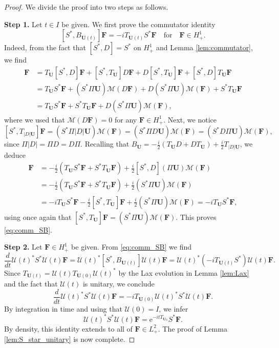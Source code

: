 \documentclass[10pt,reqno,a4paper]{amsart}
\theoremstyle{definition}
\theoremstyle{remark}
\theoremstyle{remark}
\numberwithin{equation}{section}
\newcommand{\Mean}{\mathscr{M}}
\newcommand{\be}{\begin{equation}}
\newcommand{\ee}{\end{equation}}
\newcommand{\ii}{i}
\newcommand{\eu}{\mathrm{e}}
\newcommand{\Ub}{\mathbf{U}}
\newcommand{\Fb}{\mathbf{F}}
\newcommand{\id}{I}
\newcommand{\Us}{\mathscr{U}}
\begin{document}
\begin{proof}
We divide the proof into two steps as follows.

\medskip
\textbf{Step 1.}  Let $t \in I$ be given. We first prove the commutator identity
\be \label{eq:comm_SB}
 [S^*, B_{\Ub(t)}] \Fb = -\ii T_{\Ub(t)} S^* \Fb  \quad \mbox{for} \quad \Fb \in H^1_+.
\ee
Indeed, from the fact that $[S^*, D]  = S^*$ on $H^1_+$ and Lemma \ref{lem:commutator}, we find
\begin{align*}
[S^*, T_\Ub D + D T_\Ub] \Fb & = T_\Ub [S^*,D] \Fb + [S^*,T_\Ub] D \Fb + D [S^*, T_\Ub] \Fb + [S^*,D] T_\Ub \Fb \\
& = T_{\Ub} S^* \Fb + (S^* \Pi \Ub) \Mean(D \Fb) + D ( S^* \Pi \Ub) \Mean(\Fb) + S^* T_\Ub \Fb\\
& = T_\Ub S^* \Fb + S^* T_\Ub \Fb + D (S^* \Pi \Ub) \Mean(\Fb),
\end{align*}
where we used that $\Mean(D \Fb)=0$ for any $\Fb \in H^1_+$. Next, we notice
$$
[S^*, T_{|D| \Ub}] \Fb = (S^* \Pi |D| \Ub) \Mean(\Fb) = (S^* \Pi D \Ub) \Mean(\Fb) = (S^* D \Pi \Ub) \Mean(\Fb),
$$ 
since $\Pi |D| = \Pi D = D \Pi$. Recalling that $B_\Ub=-\frac{\ii}{2}(T_\Ub D + D T_\Ub) + \frac{\ii}{2} T_{|D|\Ub}$, we deduce
\begin{align*}
[S^*, B_\Ub] \Fb & = -\frac{\ii}{2} ( T_\Ub S^* \Fb + S^* T_\Ub \Fb ) + \frac{\ii}{2} [S^*,D](\Pi \Ub) \Mean(\Fb) \\
& = -\frac{\ii}{2} ( T_\Ub S^* \Fb + S^* T_\Ub \Fb ) + \frac{\ii}{2} (S^* \Pi \Ub) \Mean(\Fb) \\
& = -\ii T_{\Ub} S^* \Fb - \frac{\ii}{2} [S^*,T_\Ub] \Fb + \frac{\ii}{2} (S^* \Pi \Ub) \Mean(\Fb)  = -\ii T_{\Ub} S^* \Fb,
\end{align*}
using once again that $[S^*, T_\Ub] \Fb = (S^* \Pi \Ub) \Mean(\Fb)$. This proves \eqref{eq:comm_SB}.

\medskip
\textbf{Step 2.} Let $\Fb \in H^1_+$ be given. From \eqref{eq:comm_SB} we find
$$
\frac{d}{dt} \Us(t)^* S^* \Us(t) \Fb  = \Us(t)^* [S^*, B_{\Ub(t)}] \Us(t) \Fb = \Us(t)^* (-\ii T_{\Ub(t)} S^* ) \Us(t) \Fb.
$$
Since $T_{\Ub(t)} = \Us(t) T_{\Ub(0)} \Us(t)^*$ by the Lax evolution in Lemma \ref{lem:Lax} and the fact that $\Us(t)$ is unitary, we conclude
$$
\frac{d}{dt} \Us(t)^* S^* \Us(t) \Fb = -\ii T_{\Ub(0)} \Us(t)^* S^* \Us(t) \Fb.
$$
By integration in time and using that $\Us(0)= \id$, we infer 
$$
\Us(t)^* S^* \Us(t) \Fb = \eu^{-\ii t T_{\Ub_0}} S^* \Fb.
$$
By density, this identity extends to all of $\Fb \in L^2_+$. The proof of Lemma \ref{lem:S_star_unitary} is now complete.
\end{proof}
\end{document}
